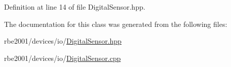 Definition at line 14 of file Digital\+Sensor.\+hpp.



The documentation for this class was generated from the following files\+:\begin{DoxyCompactItemize}
\item 
rbe2001/devices/io/\hyperlink{_digital_sensor_8hpp}{Digital\+Sensor.\+hpp}\item 
rbe2001/devices/io/\hyperlink{_digital_sensor_8cpp}{Digital\+Sensor.\+cpp}\end{DoxyCompactItemize}
